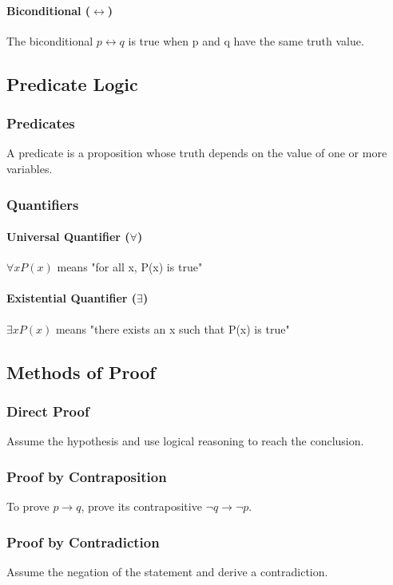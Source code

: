 \documentclass{article}
\begin{document}
\paragraph{Biconditional ($\leftrightarrow$)}
The biconditional $p \leftrightarrow q$ is true when p and q have the same truth value.

\subsection{Predicate Logic}

\subsubsection{Predicates}
A predicate is a proposition whose truth depends on the value of one or more variables.

\subsubsection{Quantifiers}

\paragraph{Universal Quantifier ($\forall$)}
$\forall x P(x)$ means "for all x, P(x) is true"

\paragraph{Existential Quantifier ($\exists$)}
$\exists x P(x)$ means "there exists an x such that P(x) is true"

\subsection{Methods of Proof}

\subsubsection{Direct Proof}
Assume the hypothesis and use logical reasoning to reach the conclusion.

\subsubsection{Proof by Contraposition}
To prove $p \rightarrow q$, prove its contrapositive $\neg q \rightarrow \neg p$.

\subsubsection{Proof by Contradiction}
Assume the negation of the statement and derive a contradiction.
\end{document}

